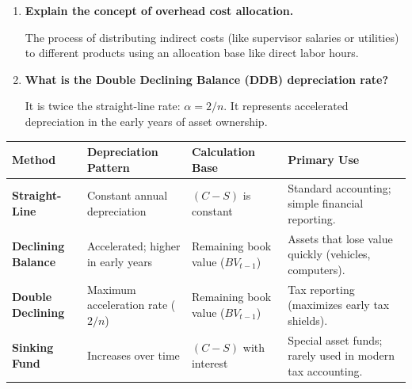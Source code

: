 \documentclass[12pt,a4paper]{article}
\newcommand{\Q}[1]{\textbf{#1}\par\noindent\ignorespaces}
\renewcommand{\arraystretch}{1.45}
\begin{document}
\begin{tcolorbox}[exambox, title={\textbf{Frequently Asked / Viva Questions}}]
\begin{enumerate}[topsep=0pt, label=\textbf{Q\arabic*.}, itemsep=5pt]
  \item \Q{Explain the concept of overhead cost allocation.}
    The process of distributing indirect costs (like supervisor salaries or utilities) to different products using an allocation base like direct labor hours.
  \item \Q{What is the Double Declining Balance (DDB) depreciation rate?}
    It is twice the straight-line rate: $\alpha = 2/n$. It represents accelerated depreciation in the early years of asset ownership.
\end{enumerate}
\end{tcolorbox}

\begin{tcolorbox}[tikzbox, title={Comparison of Depreciation Methods}]
\renewcommand{\arraystretch}{1.45}
\par\noindent
\begin{tabularx}{\linewidth}{|B{2.3cm}|Y|Y|Y|}
\hline
\textbf{Method} & \textbf{Depreciation Pattern} & \textbf{Calculation Base} & \textbf{Primary Use} \\
\hline
\textbf{Straight-Line} & Constant annual depreciation & $(C-S)$ is constant & Standard accounting; simple financial reporting. \\
\hline
\textbf{Declining Balance} & Accelerated; higher in early years & Remaining book value ($BV_{t-1}$) & Assets that lose value quickly (vehicles, computers). \\
\hline
\textbf{Double Declining} & Maximum acceleration rate ($2/n$) & Remaining book value ($BV_{t-1}$) & Tax reporting (maximizes early tax shields). \\
\hline
\textbf{Sinking Fund} & Increases over time & $(C-S)$ with interest & Special asset funds; rarely used in modern tax accounting. \\
\hline
\end{tabularx}
\end{tcolorbox}
\end{document}
